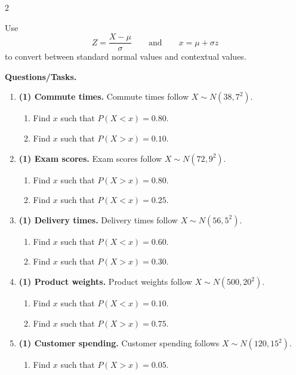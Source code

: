 \begin{multicols}{2}
\vspace{0.25cm}
\vspace{-0.25cm}

Use
\[
Z=\frac{X-\mu}{\sigma}
\qquad \text{and} \qquad
x=\mu+\sigma z
\]
to convert between standard normal values and contextual values.

\textbf{Questions/Tasks.}
\begin{enumerate}[label=\textbf{\arabic*)}]
    \item \textbf{(1) Commute times.} Commute times follow \(X\sim N(38,7^2)\).
    \begin{enumerate}[label=\textbf{\alph*)}]
        \item Find \(x\) such that \(P(X<x)=0.80\).
        \item Find \(x\) such that \(P(X>x)=0.10\).
    \end{enumerate}
    \item \textbf{(1) Exam scores.} Exam scores follow \(X\sim N(72,9^2)\).
    \begin{enumerate}[label=\textbf{\alph*)}]
        \item Find \(x\) such that \(P(X>x)=0.80\).
        \item Find \(x\) such that \(P(X<x)=0.25\).
    \end{enumerate}
    \item \textbf{(1) Delivery times.} Delivery times follow \(X\sim N(56,5^2)\).
    \begin{enumerate}[label=\textbf{\alph*)}]
        \item Find \(x\) such that \(P(X<x)=0.60\).
        \item Find \(x\) such that \(P(X>x)=0.30\).
    \end{enumerate}
    \item \textbf{(1) Product weights.} Product weights follow \(X\sim N(500,20^2)\).
    \begin{enumerate}[label=\textbf{\alph*)}]
        \item Find \(x\) such that \(P(X<x)=0.10\).
        \item Find \(x\) such that \(P(X>x)=0.75\).
    \end{enumerate}
    \item \textbf{(1) Customer spending.} Customer spending follows \(X\sim N(120,15^2)\).
    \begin{enumerate}[label=\textbf{\alph*)}]
        \item Find \(x\) such that \(P(X>x)=0.05\).

\end{enumerate}
\end{enumerate}
\end{multicols}
